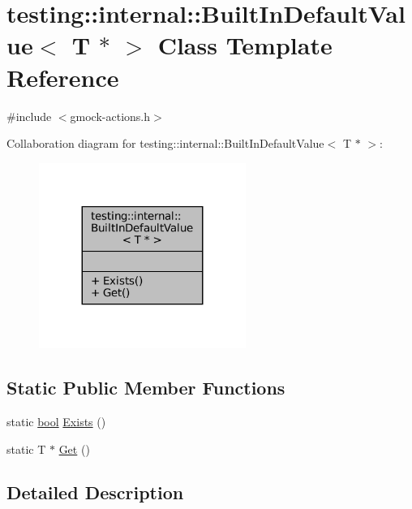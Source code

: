 \hypertarget{classtesting_1_1internal_1_1BuiltInDefaultValue_3_01T_01_5_01_4}{}\section{testing\+:\+:internal\+:\+:Built\+In\+Default\+Value$<$ T $\ast$ $>$ Class Template Reference}
\label{classtesting_1_1internal_1_1BuiltInDefaultValue_3_01T_01_5_01_4}


{\ttfamily \#include $<$gmock-\/actions.\+h$>$}



Collaboration diagram for testing\+:\+:internal\+:\+:Built\+In\+Default\+Value$<$ T $\ast$ $>$\+:
\nopagebreak
\begin{figure}[H]
\begin{center}
\leavevmode
\includegraphics[width=191pt]{classtesting_1_1internal_1_1BuiltInDefaultValue_3_01T_01_5_01_4__coll__graph}
\end{center}
\end{figure}
\subsection*{Static Public Member Functions}
\begin{DoxyCompactItemize}
\item 
static \hyperlink{classbool}{bool} \hyperlink{classtesting_1_1internal_1_1BuiltInDefaultValue_3_01T_01_5_01_4_aafa7172f63d068305fb37d5db40bb543}{Exists} ()
\item 
static T $\ast$ \hyperlink{classtesting_1_1internal_1_1BuiltInDefaultValue_3_01T_01_5_01_4_adc2fa2bdae767589d171ae3a117e3a9f}{Get} ()
\end{DoxyCompactItemize}


\subsection{Detailed Description}
